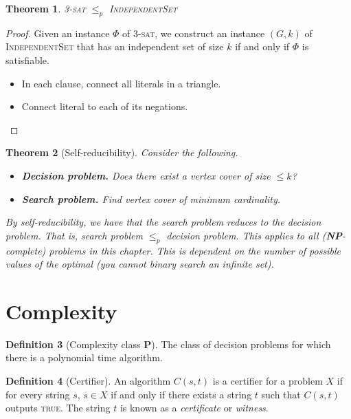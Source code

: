 \documentclass[10pt, oneside, reqno]{amsart}
\theoremstyle{plain}%
\newtheorem{thm}{Theorem}[section]
\theoremstyle{definition}
\newtheorem{defn}[thm]{Definition}
\theoremstyle{remark}
\begin{document}
\begin{thm}
    \textsc{3-sat} $\leq_p$ \textsc{IndependentSet}
\end{thm}
\begin{proof}
    Given an instance $\Phi$ of \textsc{3-sat}, we construct an instance $(G,k)$ of \textsc{IndependentSet} that has an independent set of size $k$ if and only if $\Phi$ is satisfiable.  
    \begin{itemize}
        \item In each clause, connect all literals in a triangle.  
        \item Connect literal to each of its negations.
    \end{itemize}
\end{proof}



\begin{thm}[Self-reducibility]Consider the following.
    \begin{itemize}
        \item \textbf{Decision problem.}  Does there exist a vertex cover of size $\leq k$?
        
        \item \textbf{Search problem.}  Find vertex cover of minimum cardinality.
        
    \end{itemize}
        
        
        By self-reducibility, we have that the search problem reduces to the decision problem. That is, search problem $\leq_p$ decision problem.  This applies to all (\textbf{NP}-complete) problems in this chapter. This is dependent on the number of possible values of the optimal (you cannot binary search an infinite set).
\end{thm}





\section{Complexity} %
\label{sec:complexity}

\begin{defn}[Complexity class \textbf{P}]
    The class of decision problems for which there is a polynomial time algorithm.
\end{defn}

\begin{defn}[Certifier]
    An algorithm $C(s,t)$ is a certifier for a problem $X$ if for every string $s$, $s \in X$ if and only if there exists a string $t$ such that $C(s,t)$ outputs \textsc{true}.  The string $t$ is known as a \emph{certificate} or \emph{witness}.  
\end{defn}
\end{document}

